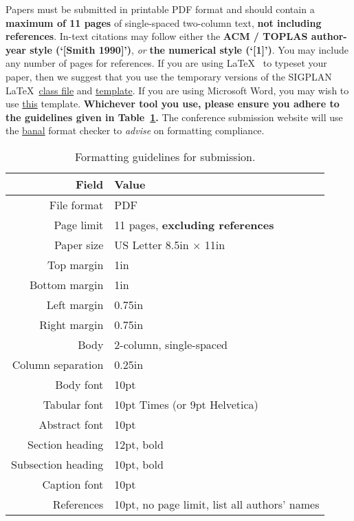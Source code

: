 \documentclass[pldi]{sigplanconf-pldi16}
\begin{document}
Papers must be submitted in printable PDF format and should contain a
\textbf{maximum of 11 pages} of single-spaced two-column text,
\textbf{not including references}.  In-text citations may follow either the
\textbf{ACM / TOPLAS author-year style (`[Smith 1990]')}, 
\emph{or} \textbf{the numerical style (`[1]')}.  You may include any number of pages for
references.  If you are using
\LaTeX~\cite{Lamport:94} to typeset your paper, then we suggest that
you use the temporary versions of the SIGPLAN 
\LaTeX~\href{https://github.com/emeryberger/PLDI-2016/blob/master/sigplanconf-pldi16.cls}{class
  file} and
\href{https://github.com/emeryberger/PLDI-2016/blob/master/pldi16-template.tex}{template}.
If you are using
Microsoft Word, you may wish to use
\href{http://conf.researchr.org/getImage/pldi2015/orig/pldi15-word-template.dot}{this}
template.  \textbf{Whichever tool you use, please ensure you adhere to the
guidelines given in Table~\ref{table:formatting}.}  The conference
submission website will use the
\href{https://www.usenix.org/legacy/event/wowcs08/tech/full_papers/voelker/voelker.pdf}{banal}
format checker to \emph{advise} on formatting compliance.

\begin{table}[t!]
  \centering
{  \sffamily\small %
  \begin{tabular}{rl}
    \textbf{Field} & \textbf{Value}\\
    \hline
    File format & PDF \\
    Page limit & 11 pages, \textbf{excluding references}\\
    Paper size & US Letter 8.5in $\times$ 11in\\
    Top margin & 1in\\
    Bottom margin & 1in\\
    Left margin & 0.75in\\
    Right margin & 0.75in\\
    Body & 2-column, single-spaced\\
    Column separation & 0.25in\\
    Body font & 10pt\\
    Tabular font & 10pt Times (or 9pt Helvetica)\\
    Abstract font & 10pt\\
    Section heading  & 12pt, bold\\
    Subsection heading  & 10pt, bold\\
    Caption font & 10pt\\
    References & 10pt, no page limit, list all authors' names\\
  \end{tabular}
}
  \caption{Formatting guidelines for submission. }
  \label{table:formatting}
\end{table}
\end{document}
